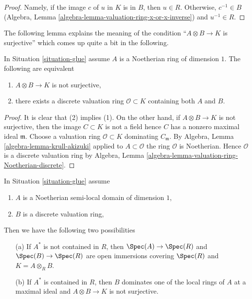 \begin{proof}
Namely, if the image $c$ of $u$ in $K$ is in $B$, then $u \in R$.
Otherwise, $c^{-1} \in B$
(Algebra, Lemma \ref{algebra-lemma-valuation-ring-x-or-x-inverse})
and $u^{-1} \in R$.
\end{proof}

\noindent
The following lemma explains the meaning of the condition
``$A \otimes B \to K$ is surjective'' which comes up quite
a bit in the following.

\begin{lemma}
\label{lemma-glue-separated}
In Situation \ref{situation-glue} assume $A$ is a Noetherian
ring of dimension $1$. The following are equivalent
\begin{enumerate}
\item $A \otimes B \to K$ is not surjective,
\item there exists a discrete valuation ring $\mathcal{O} \subset K$
containing both $A$ and $B$.
\end{enumerate}
\end{lemma}

\begin{proof}
It is clear that (2) implies (1). On the other hand, if $A \otimes B \to K$
is not surjective, then the image $C \subset K$ is not a field hence
$C$ has a nonzero maximal ideal $\mathfrak m$. Choose a valuation ring
$\mathcal{O} \subset K$ dominating $C_\mathfrak m$. By
Algebra, Lemma \ref{algebra-lemma-krull-akizuki} applied to
$A \subset \mathcal{O}$ the ring $\mathcal{O}$ is Noetherian.
Hence $\mathcal{O}$ is a discrete valuation ring by
Algebra, Lemma \ref{algebra-lemma-valuation-ring-Noetherian-discrete}.
\end{proof}

\begin{lemma}
\label{lemma-semi-local}
In Situation \ref{situation-glue} assume
\begin{enumerate}
\item $A$ is a Noetherian semi-local domain of dimension $1$,
\item $B$ is a discrete valuation ring,
\end{enumerate}
Then we have the following two possibilities
\begin{enumerate}
\item[(a)] If $A^*$ is not contained in $R$, then
$\Spec(A) \to \Spec(R)$ and $\Spec(B) \to \Spec(R)$
are open immersions covering $\Spec(R)$ and $K = A \otimes_R B$.
\item[(b)] If $A^*$ is contained in $R$, then $B$ dominates one of
the local rings of $A$ at a maximal ideal and $A \otimes B \to K$
is not surjective.
\end{enumerate}
\end{lemma}

